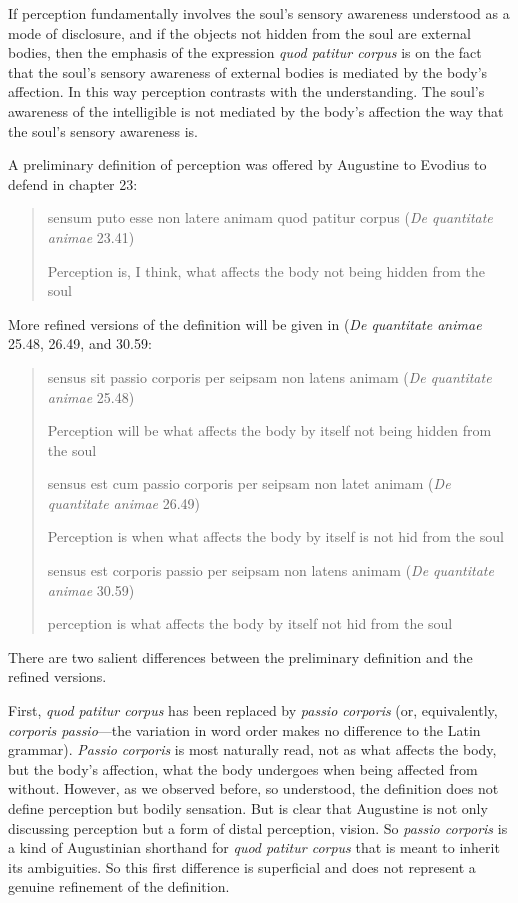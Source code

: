 \documentclass[12pt]{article}
\begin{document}
If perception fundamentally involves the soul's sensory awareness understood as a mode of disclosure, and if the objects not hidden from the soul are external bodies, then the emphasis of the expression \emph{quod patitur corpus} is on the fact that the soul's sensory awareness of external bodies is mediated by the body's affection. In this way perception contrasts with the understanding. The soul's awareness of the intelligible is not mediated by the body's affection the way that the soul's sensory awareness is.

A preliminary definition of perception was offered by Augustine to Evodius to defend in chapter 23:
\begin{quote}
	sensum puto esse non latere animam quod patitur corpus (\emph{De quantitate animae} 23.41)
	
	Perception is, I think, what affects the body not being hidden from the soul
\end{quote}	
More refined versions of the definition will be given in (\emph{De quantitate animae} 25.48, 26.49, and 30.59:
\begin{quote}
	sensus sit passio corporis per seipsam non latens animam (\emph{De quantitate animae} 25.48)
	
	Perception will be what affects the body by itself not being hidden from the soul
	
	sensus est cum passio corporis per seipsam non latet animam (\emph{De quantitate animae} 26.49)
	
	Perception is when what affects the body by itself is not hid from the soul
	
	sensus est corporis passio per seipsam non latens animam (\emph{De quantitate animae} 30.59)
	
	perception is what affects the body by itself not hid from the soul
\end{quote}
There are two salient differences between the preliminary definition and the refined versions.

First, \emph{quod patitur corpus} has been replaced by \emph{passio corporis} (or, equivalently, \emph{corporis passio}—the variation in word order makes no difference to the Latin grammar). \emph{Passio corporis} is most naturally read, not as what affects the body, but the body's affection, what the body undergoes when being affected from without. However, as we observed before, so understood, the definition does not define perception but bodily sensation. But is clear that Augustine is not only discussing perception but a form of distal perception, vision. So \emph{passio corporis} is a kind of Augustinian shorthand for \emph{quod patitur corpus} that is meant to inherit its ambiguities. So this first difference is superficial and does not represent a genuine refinement of the definition.
\end{document}
